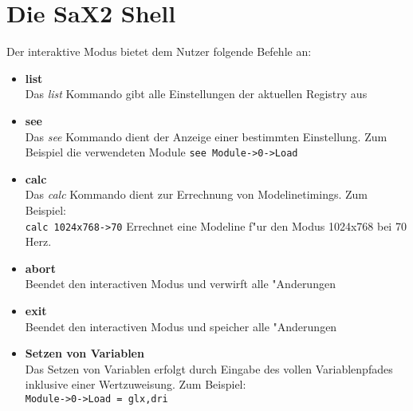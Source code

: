 \section{Die SaX2 Shell}
Der interaktive Modus bietet dem Nutzer folgende Befehle an:
\begin{itemize}
\item  \textbf{list}\\
       Das \textit{list} Kommando gibt alle Einstellungen der
       aktuellen Registry aus

\item  \textbf{see}\\
       Das \textit{see} Kommando dient der Anzeige einer
       bestimmten Einstellung. Zum Beispiel die verwendeten Module
       \verb+see Module->0->Load+

\item  \textbf{calc}\\
       Das \textit{calc} Kommando dient zur Errechnung von
       Modelinetimings. Zum Beispiel:\\
       \verb+calc 1024x768->70+ Errechnet eine Modeline f"ur
       den Modus 1024x768 bei 70 Herz.

\item  \textbf{abort}\\
       Beendet den interactiven Modus und verwirft alle "Anderungen

\item  \textbf{exit}\\
       Beendet den interactiven Modus und speicher alle "Anderungen

\item  \textbf{Setzen von Variablen}\\
       Das Setzen von Variablen erfolgt durch Eingabe des vollen
       Variablenpfades inklusive einer Wertzuweisung. Zum Beispiel:\\
       \verb+Module->0->Load = glx,dri+
\end{itemize}

